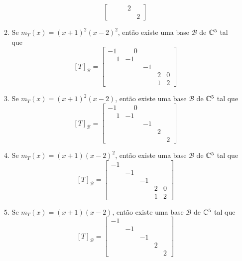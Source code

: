 \begin{exemplo}
\begin{enumerate}[label={\arabic*})]
\begin{solucao}
\begin{enumerate}
\[\begin{bmatrix}
					& & & 2 & \\
					& & & & 2
				\end{bmatrix}
				\]
				\item Se $m_T(x) = (x + 1)^2(x - 2)^2$, ent\~ao existe uma base $\mathcal{B}$ de $\mathbb{C}^5$ tal que
				\[
					[T]_\mathcal{B} = \begin{bmatrix}
					-1 & \phantom{-}0 &\\
					\phantom{-}1 & -1 &\\
					& & -1 & & \\
					& & & 2 & 0\\
					& & & 1 & 2
				\end{bmatrix}
				\]
				\item Se $m_T(x) = (x + 1)^2(x - 2)$, ent\~ao existe uma base $\mathcal{B}$ de $\mathbb{C}^5$ tal que
				\[
					[T]_\mathcal{B} = \begin{bmatrix}
					-1 & \phantom{-}0 & & &\\
					\phantom{-}1 & -1 & & & \\
					& & -1 & &\\
					& & & 2 & \\
					& & & & 2
				\end{bmatrix}
				\]
				\item Se $m_T(x) = (x + 1)(x - 2)^2$, ent\~ao existe uma base $\mathcal{B}$ de $\mathbb{C}^5$ tal que
				\[
					[T]_\mathcal{B} = \begin{bmatrix}
					-1 & & & &\\
					& -1 & & & \\
					& & -1 & &\\
					& & & 2 & 0\\
					& & & 1 & 2
				\end{bmatrix}
				\]
				\item Se $m_T(x) = (x + 1)(x - 2)$, ent\~ao existe uma base $\mathcal{B}$ de $\mathbb{C}^5$ tal que
				\[
					[T]_\mathcal{B} = \begin{bmatrix}
					-1 & & & &\\
					& -1 & & & \\
					& & -1 & &\\
					& & & 2 &\\
					& & & & 2
				\end{bmatrix}
				\]
			\end{enumerate}


\end{solucao}
\end{enumerate}
\end{exemplo}
